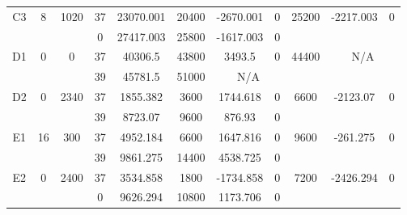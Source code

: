\begin{sidewaystable}
\begin{tabular}{c||c|c||c|c|c|c|c||c|c|c}
         &
        
      \\
      \hline
      \multirow{2}{*}{C3} &
      \multirow{2}{*}{8} &
      \multirow{2}{*}{1020} &
      37 &
      23070.001 &
      20400 &
        -2670.001 &
        0 &
      \multirow{2}{*}{25200} &
        \multirow{2}{*}{-2217.003} &
        \multirow{2}{*}{0}
      \\
      \cline{4-8}
       &
       &
       &
      0 &
      27417.003 &
      25800 &
        -1617.003 &
        0 &
      
         &
        
      \\
      \hline
      \multirow{2}{*}{D1} &
      \multirow{2}{*}{0} &
      \multirow{2}{*}{0} &
      37 &
      40306.5 &
      43800 &
        3493.5 &
        0 &
      \multirow{2}{*}{44400} &
        \multicolumn{2}{c}{\multirow{2}{*}{N/A}}
      \\
      \cline{4-8}
       &
       &
       &
      39 &
      45781.5 &
      51000 &
        \multicolumn{2}{|c||}{N/A} &
      
        
      \\
      \hline
      \multirow{2}{*}{D2} &
      \multirow{2}{*}{0} &
      \multirow{2}{*}{2340} &
      37 &
      1855.382 &
      3600 &
        1744.618 &
        0 &
      \multirow{2}{*}{6600} &
        \multirow{2}{*}{-2123.07} &
        \multirow{2}{*}{0}
      \\
      \cline{4-8}
       &
       &
       &
      39 &
      8723.07 &
      9600 &
        876.93 &
        0 &
      
         &
        
      \\
      \hline
      \multirow{2}{*}{E1} &
      \multirow{2}{*}{16} &
      \multirow{2}{*}{300} &
      37 &
      4952.184 &
      6600 &
        1647.816 &
        0 &
      \multirow{2}{*}{9600} &
        \multirow{2}{*}{-261.275} &
        \multirow{2}{*}{0}
      \\
      \cline{4-8}
       &
       &
       &
      39 &
      9861.275 &
      14400 &
        4538.725 &
        0 &
      
         &
        
      \\
      \hline
      \multirow{2}{*}{E2} &
      \multirow{2}{*}{0} &
      \multirow{2}{*}{2400} &
      37 &
      3534.858 &
      1800 &
        -1734.858 &
        0 &
      \multirow{2}{*}{7200} &
        \multirow{2}{*}{-2426.294} &
        \multirow{2}{*}{0}
      \\
      \cline{4-8}
       &
       &
       &
      0 &
      9626.294 &
      10800 &
        1173.706 &
        0 &
      

\end{tabular}
\end{sidewaystable}
